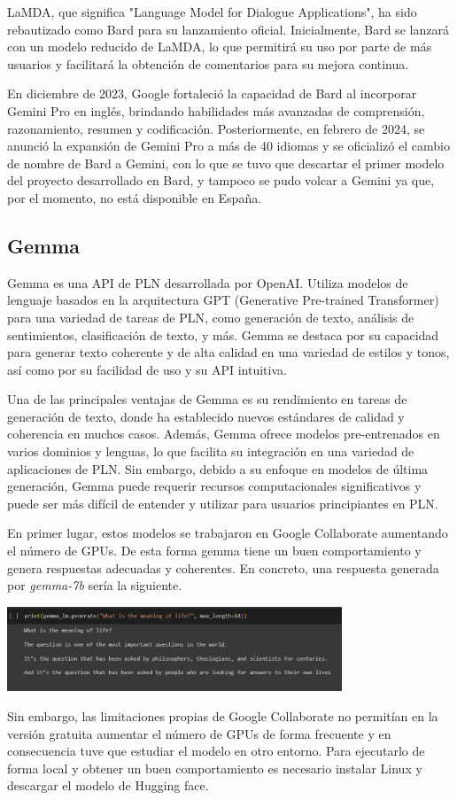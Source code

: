 LaMDA, que significa "Language Model for Dialogue Applications", ha sido rebautizado como Bard para su lanzamiento oficial. Inicialmente, Bard se lanzará con un modelo reducido de LaMDA, lo que permitirá su uso por parte de más usuarios y facilitará la obtención de comentarios para su mejora continua.

En diciembre de 2023, Google fortaleció la capacidad de Bard al incorporar Gemini Pro en inglés, brindando habilidades más avanzadas de comprensión, razonamiento, resumen y codificación. Posteriormente, en febrero de 2024, se anunció la expansión de Gemini Pro a más de 40 idiomas y se oficializó el cambio de nombre de Bard a Gemini, con lo que se tuvo que descartar el primer modelo del proyecto desarrollado en Bard, y tampoco se pudo volcar a Gemini ya que, por el momento, no está disponible en España. 
\subsection{Gemma}

Gemma es una API de PLN desarrollada por OpenAI. Utiliza modelos de lenguaje basados en la arquitectura GPT (Generative Pre-trained Transformer) para una variedad de tareas de PLN, como generación de texto, análisis de sentimientos, clasificación de texto, y más. Gemma se destaca por su capacidad para generar texto coherente y de alta calidad en una variedad de estilos y tonos, así como por su facilidad de uso y su API intuitiva.

Una de las principales ventajas de Gemma es su rendimiento en tareas de generación de texto, donde ha establecido nuevos estándares de calidad y coherencia en muchos casos. Además, Gemma ofrece modelos pre-entrenados en varios dominios y lenguas, lo que facilita su integración en una variedad de aplicaciones de PLN. Sin embargo, debido a su enfoque en modelos de última generación, Gemma puede requerir recursos computacionales significativos y puede ser más difícil de entender y utilizar para usuarios principiantes en PLN.


En primer lugar, estos modelos se trabajaron en Google Collaborate aumentando el número de GPUs. De esta forma gemma tiene un buen comportamiento y genera respuestas adecuadas y coherentes. En concreto, una respuesta generada por \textit{gemma-7b} sería la siguiente.
\begin{center}
	\includegraphics[width=0.75\textwidth]{Imagenes/gemma (1)}
\end{center}
Sin embargo, las limitaciones propias de Google Collaborate no permitían en la versión gratuita aumentar el número de GPUs de forma frecuente y en consecuencia tuve que estudiar el modelo en otro entorno. Para ejecutarlo de forma local y obtener un buen comportamiento es necesario instalar Linux y descargar el modelo de Hugging face. 

